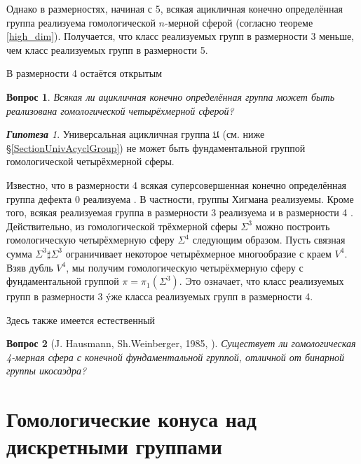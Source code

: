 \documentclass[14pt, dvipsnames, twoside]{extarticle}
\newtheorem{question}{Вопрос}
\theoremstyle{definition}
\theoremstyle{remark}
\newtheorem*{hypothesis}{\bf Гипотеза}
\begin{document}
Однако в размерностях, начиная с 5, всякая ацикличная конечно определённая группа реализуема гомологической $n$-мерной сферой (согласно теореме \ref{high_dim}). Получается, что класс реализуемых групп в размерности 3 меньше, чем класс реализуемых групп в размерности 5.

В размерности 4 остаётся открытым 

\begin{question}
Всякая ли ацикличная конечно определённая группа может быть реализована гомологической четырёхмерной сферой?
\end{question}

\begin{hypothesis}
Универсальная ацикличная группа $\mathfrak{U}$ (см. ниже \S\ref{SectionUnivAcyclGroup}) не может быть фундаментальной группой гомологической четырёхмерной сферы.
\end{hypothesis}

Известно, что в размерности 4 всякая суперсовершенная конечно определённая группа дефекта 0 реализуема \cite{Kervaire}. В частности, группы Хигмана реализуемы. Кроме того, всякая реализуемая группа в размерности 3 реализуема и в размерности 4 \cite{double}. Действительно, из гомологической трёхмерной сферы $\Sigma^3$ можно построить гомологическую четырёхмерную сферу $\Sigma^4$ следующим образом. Пусть связная сумма $\Sigma^3\sharp \Sigma^3$ ограничивает некоторое четырёхмерное многообразие с краем $V^4$. Взяв дубль $V^4$, мы получим гомологическую четырёхмерную сферу с фундаментальной группой $\pi=\pi_1(\Sigma^3)$. Это означает, что класс реализуемых групп в размерности 3 \'yже класса реализуемых групп в размерности 4. 

Здесь также имеется естественный 

\begin{question}[J. Hausmann, Sh.Weinberger, 1985,  \cite{Hausmann}]
Существует ли гомологическая 4-мерная сфера с конечной фундаментальной группой, отличной от бинарной группы икосаэдра? 
\end{question}




















\section{Гомологические конуса над дискретными группами}
\end{document}
